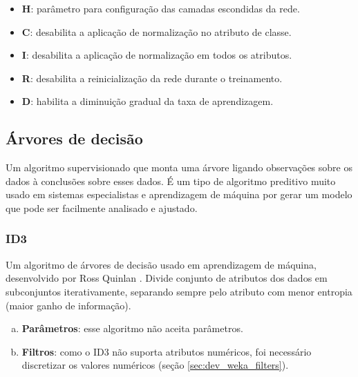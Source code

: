 \begin{enumerate}[a)]
\begin{itemize}
            \item \textbf{H}: parâmetro para configuração das camadas escondidas da rede.

            \item \textbf{C}: desabilita a aplicação de normalização no atributo de classe.

            \item \textbf{I}: desabilita a aplicação de normalização em todos os atributos.

            \item \textbf{R}: desabilita a reinicialização da rede durante o treinamento.

            \item \textbf{D}: habilita a diminuição gradual da taxa de aprendizagem.
        \end{itemize}
\end{enumerate}

\subsection{Árvores de decisão}

Um algoritmo supervisionado que monta uma árvore ligando observações sobre os dados à conclusões sobre esses dados. É um tipo de algoritmo preditivo muito usado em sistemas especialistas e aprendizagem de máquina por gerar um modelo que pode ser facilmente analisado e ajustado.

\subsubsection{ID3}

Um algoritmo de árvores de decisão usado em aprendizagem de máquina, desenvolvido por Ross Quinlan \cite{Quinlan1986}. Divide conjunto de atributos dos dados em subconjuntos iterativamente, separando sempre pelo atributo com menor entropia (maior ganho de informação).

\begin{enumerate}[a)]
    \item \textbf{Parâmetros}: esse algoritmo não aceita parâmetros.
    \item \textbf{Filtros}: como o ID3 não suporta atributos numéricos, foi necessário discretizar os valores numéricos (seção \ref{sec:dev_weka_filters}).
\end{enumerate}

